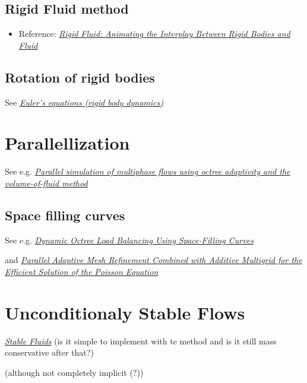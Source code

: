 \subsection{Rigid Fluid method}

\begin{itemize}
    \item Reference: \textit{\href{http://www.amath.unc.edu/Faculty/mucha/Reprints/siggraph04.pdf}{Rigid Fluid: Animating the Interplay Between Rigid Bodies and Fluid}}
\end{itemize}

\subsection{Rotation of rigid bodies}

See \textit{\href{http://en.wikipedia.org/wiki/Euler\%27s_equations_\%28rigid_body_dynamics\%29}{Euler's equations (rigid body dynamics)}}

\section{Parallellization}

See e.g. \textit{\href{http://gfs.sourceforge.net/papers/agbaglah2011.pdf}{Parallel simulation of multiphase flows using octree adaptivity and the volume-of-fluid method}}

\subsection{Space filling curves}

See e.g. \textit{\href{http://j.teresco.org/research/publications/octpart02/octpart02.pdf}{Dynamic Octree Load Balancing Using Space-Filling Curves}}

and \textit{\href{http://downloads.isrn.com/journals/appmath/2012/246491.pdf}{Parallel Adaptive Mesh Refinement Combined with Additive Multigrid for the Efficient Solution of the Poisson Equation}}

\section{Unconditionaly Stable Flows}

\textit{\href{http://www.dgp.toronto.edu/people/stam/reality/Research/pdf/ns.pdf}{Stable Fluids}} (is it simple to implement with te \VOF method and is it still mass conservative after that?)

\SIMPLE (although not completely implicit (?))

